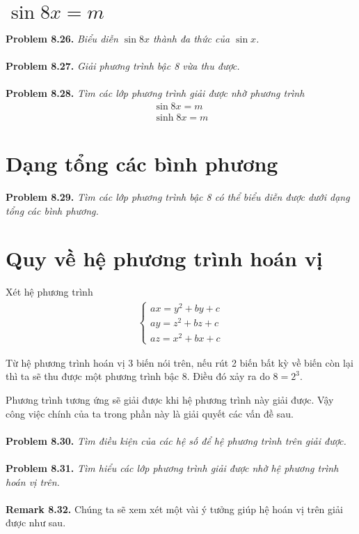 \documentclass[a4paper,oneside]{book}
\numberwithin{equation}{chapter}
\begin{document}
\section{$\sin 8x = m$}
\textbf{Problem 8.26.} \textit{Biểu diễn $\sin 8x$ thành đa thức của $\sin x$.}\\
\\
\textbf{Problem 8.27.} \textit{Giải phương trình bậc 8 vừa thu được.}\\
\\
\textbf{Problem 8.28.} \textit{Tìm các lớp phương trình giải được nhờ phương trình}
\begin{align}
\sin 8x = m\\
\sinh 8x = m
\end{align}
\section{Dạng tổng các bình phương}
\textbf{Problem 8.29.} \textit{Tìm các lớp phương trình bậc 8 có thể biểu diễn được dưới dạng tổng các bình phương.}
\section{Quy về hệ phương trình hoán vị}
Xét hệ phương trình
\begin{align}
\left\{ {\begin{array}{*{20}{c}}
{ax = {y^2} + by + c}\\
{ay = {z^2} + bz + c}\\
{az = {x^2} + bx + c}
\end{array}} \right.
\end{align}

Từ hệ phương trình hoán vị 3 biến nói trên, nếu rút 2 biến bất kỳ về biến còn lại thì ta sẽ thu được một phương trình bậc 8. Điều đó xảy ra do $8 = {2^3}$.

Phương trình tương ứng sẽ giải được khi hệ phương trình này giải được. Vậy công việc chính của ta trong phần này là giải quyết các vấn đề sau.\\
\\
\textbf{Problem 8.30.} \textit{Tìm điều kiện của các hệ số để hệ phương trình trên giải được.}\\
\\
\textbf{Problem 8.31.} \textit{Tìm hiểu các lớp phương trình giải được nhờ hệ phương trình hoán vị trên.}\\
\\
\textbf{Remark 8.32.} Chúng ta sẽ xem xét một vài ý tưởng giúp hệ hoán vị trên giải được như sau.\\
\end{document}
